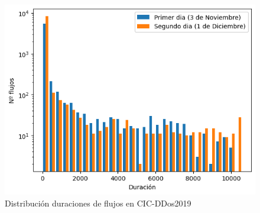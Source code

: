 \begin{figure}[H]
    \begin{center}
        \includegraphics[width=0.49\linewidth]{media/cicddos_2019_pcap_duration_distribution.png}
    \end{center}
    \captionsetup{justification=centering}
    \caption{Distribución duraciones de flujos en CIC-DDos2019}\label{fig:cicddos_2019_pcap_duration_distribution}
\end{figure}

